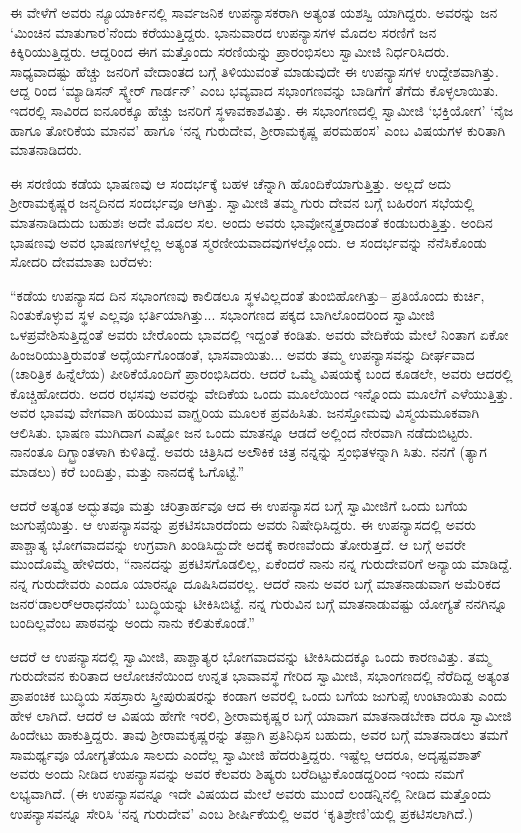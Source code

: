 ಈ ವೇಳೆಗೆ ಅವರು ನ್ಯೂಯಾರ್ಕಿನಲ್ಲಿ ಸಾರ್ವಜನಿಕ ಉಪನ್ಯಾಸಕರಾಗಿ ಅತ್ಯಂತ ಯಶಸ್ವಿ ಯಾಗಿದ್ದರು. ಅವರನ್ನು ಜನ ‘ಮಿಂಚಿನ ಮಾತುಗಾರ’ನೆಂದು ಕರೆಯುತ್ತಿದ್ದರು. ಭಾನುವಾರದ ಉಪನ್ಯಾಸಗಳ ಮೊದಲ ಸರಣಿಗೆ ಜನ ಕಿಕ್ಕಿರಿಯುತ್ತಿದ್ದರು. ಆದ್ದರಿಂದ ಈಗ ಮತ್ತೊಂದು ಸರಣಿಯನ್ನು ಪ್ರಾರಂಭಿಸಲು ಸ್ವಾಮೀಜಿ ನಿರ್ಧರಿಸಿದರು. ಸಾಧ್ಯವಾದಷ್ಟು ಹೆಚ್ಚು ಜನರಿಗೆ ವೇದಾಂತದ ಬಗ್ಗೆ ತಿಳಿಯುವಂತೆ ಮಾಡುವುದೇ ಈ ಉಪನ್ಯಾಸಗಳ ಉದ್ದೇಶವಾಗಿತ್ತು. ಆದ್ದ ರಿಂದ ‘ಮ್ಯಾಡಿಸನ್ ಸ್ಕ್ವೇರ್ ಗಾರ್ಡನ್​’ ಎಂಬ ಭವ್ಯವಾದ ಸಭಾಂಗಣವನ್ನು ಬಾಡಿಗೆಗೆ ತೆಗೆದು ಕೊಳ್ಳಲಾಯಿತು. ಇದರಲ್ಲಿ ಸಾವಿರದ ಐನೂರಕ್ಕೂ ಹೆಚ್ಚು ಜನರಿಗೆ ಸ್ಥಳಾವಕಾಶವಿತ್ತು. ಈ ಸಭಾಂಗಣದಲ್ಲಿ ಸ್ವಾಮೀಜಿ ‘ಭಕ್ತಿಯೋಗ’ ‘ನೈಜ ಹಾಗೂ ತೋರಿಕೆಯ ಮಾನವ’ ಹಾಗೂ ‘ನನ್ನ ಗುರುದೇವ, ಶ್ರೀರಾಮಕೃಷ್ಣ ಪರಮಹಂಸ’ ಎಂಬ ವಿಷಯಗಳ ಕುರಿತಾಗಿ ಮಾತನಾಡಿದರು.

ಈ ಸರಣಿಯ ಕಡೆಯ ಭಾಷಣವು ಆ ಸಂದರ್ಭಕ್ಕೆ ಬಹಳ ಚೆನ್ನಾಗಿ ಹೊಂದಿಕೆಯಾಗುತ್ತಿತ್ತು. ಅಲ್ಲದೆ ಅದು ಶ್ರೀರಾಮಕೃಷ್ಣರ ಜನ್ಮದಿನದ ಸಂದರ್ಭವೂ ಆಗಿತ್ತು. ಸ್ವಾಮೀಜಿ ತಮ್ಮ ಗುರು ದೇವನ ಬಗ್ಗೆ ಬಹಿರಂಗ ಸಭೆಯಲ್ಲಿ ಮಾತನಾಡಿದುದು ಬಹುಶಃ ಅದೇ ಮೊದಲ ಸಲ. ಅಂದು ಅವರು ಭಾವೋನ್ಮತ್ತರಾದಂತೆ ಕಂಡುಬರುತ್ತಿತ್ತು. ಅಂದಿನ ಭಾಷಣವು ಅವರ ಭಾಷಣಗಳಲ್ಲೆಲ್ಲ ಅತ್ಯಂತ ಸ್ಮರಣೀಯವಾದವುಗಳಲ್ಲೊಂದು. ಆ ಸಂದರ್ಭವನ್ನು ನೆನೆಸಿಕೊಂಡು ಸೋದರಿ ದೇವಮಾತಾ ಬರೆದಳು:

“ಕಡೆಯ ಉಪನ್ಯಾಸದ ದಿನ ಸಭಾಂಗಣವು ಕಾಲಿಡಲೂ ಸ್ಥಳವಿಲ್ಲದಂತೆ ತುಂಬಿಹೋಗಿತ್ತು– ಪ್ರತಿಯೊಂದು ಕುರ್ಚಿ, ನಿಂತುಕೊಳ್ಳುವ ಸ್ಥಳ ಎಲ್ಲವೂ ಭರ್ತಿಯಾಗಿತ್ತು... ಸಭಾಂಗಣದ ಪಕ್ಕದ ಬಾಗಿಲೊಂದರಿಂದ ಸ್ವಾಮೀಜಿ ಒಳಪ್ರವೇಶಿಸುತ್ತಿದ್ದಂತೆ ಅವರು ಬೇರೊಂದು ಭಾವದಲ್ಲಿ ಇದ್ದಂತೆ ಕಂಡಿತು. ಅವರು ವೇದಿಕೆಯ ಮೇಲೆ ನಿಂತಾಗ ಏಕೋ ಹಿಂಜರಿಯುತ್ತಿರುವಂತೆ ಅಧೈರ್ಯಗೊಂಡಂತೆ, ಭಾಸವಾಯಿತು... ಅವರು ತಮ್ಮ ಉಪನ್ಯಾಸವನ್ನು ದೀರ್ಘವಾದ (ಚಾರಿತ್ರಿಕ ಹಿನ್ನೆಲೆಯ) ಪೀಠಿಕೆಯೊಂದಿಗೆ ಪ್ರಾರಂಭಿಸಿದರು. ಆದರೆ ಒಮ್ಮೆ ವಿಷಯಕ್ಕೆ ಬಂದ ಕೂಡಲೇ, ಅವರು ಆದರಲ್ಲಿ ಕೊಚ್ಚಿಹೋದರು. ಅದರ ರಭಸವು ಅವರನ್ನು ವೇದಿಕೆಯ ಒಂದು ಮೂಲೆಯಿಂದ ಇನ್ನೊಂದು ಮೂಲೆಗೆ ಎಳೆಯುತ್ತಿತ್ತು. ಅವರ ಭಾವವು ವೇಗವಾಗಿ ಹರಿಯುವ ವಾಗ್ಝರಿಯ ಮೂಲಕ ಪ್ರವಹಿಸಿತು. ಜನಸ್ತೋಮವು ವಿಸ್ಮಯಮೂಕವಾಗಿ ಆಲಿಸಿತು. ಭಾಷಣ ಮುಗಿದಾಗ ಎಷ್ಟೋ ಜನ ಒಂದು ಮಾತನ್ನೂ ಆಡದೆ ಅಲ್ಲಿಂದ ನೇರವಾಗಿ ನಡೆದುಬಿಟ್ಟರು. ನಾನಂತೂ ದಿಗ್ಭ್ರಾಂತಳಾಗಿ ಕುಳಿತಿದ್ದೆ. ಅವರು ಚಿತ್ರಿಸಿದ ಅಲೌಕಿಕ ಚಿತ್ರ ನನ್ನನ್ನು ಸ್ತಂಭಿತಳನ್ನಾಗಿ ಸಿತು. ನನಗೆ (ತ್ಯಾಗ ಮಾಡಲು) ಕರೆ ಬಂದಿತ್ತು, ಮತ್ತು ನಾನದಕ್ಕೆ ಓಗೊಟ್ಟೆ.”

ಆದರೆ ಅತ್ಯಂತ ಅದ್ಭುತವೂ ಮತ್ತು ಚರಿತ್ರಾರ್ಹವೂ ಆದ ಈ ಉಪನ್ಯಾಸದ ಬಗ್ಗೆ ಸ್ವಾಮೀಜಿಗೆ ಒಂದು ಬಗೆಯ ಜುಗುಪ್ಸೆಯಿತ್ತು. ಆ ಉಪನ್ಯಾಸವನ್ನು ಪ್ರಕಟಿಸಬಾರದೆಂದು ಅವರು ನಿಷೇಧಿಸಿದ್ದರು. ಈ ಉಪನ್ಯಾಸದಲ್ಲಿ ಅವರು ಪಾಶ್ಚಾತ್ಯ ಭೋಗವಾದವನ್ನು ಉಗ್ರವಾಗಿ ಖಂಡಿಸಿದ್ದುದೇ ಅದಕ್ಕೆ ಕಾರಣವೆಂದು ತೋರುತ್ತದೆ. ಆ ಬಗ್ಗೆ ಅವರೇ ಮುಂದೊಮ್ಮೆ ಹೇಳಿದರು, “ನಾನದನ್ನು ಪ್ರಕಟಿಸಗೊಡಲಿಲ್ಲ, ಏಕೆಂದರೆ ನಾನು ನನ್ನ ಗುರುದೇವರಿಗೆ ಅನ್ಯಾಯ ಮಾಡಿದ್ದೆ. ನನ್ನ ಗುರುದೇವರು ಎಂದೂ ಯಾರನ್ನೂ ದೂಷಿಸಿದವರಲ್ಲ. ಆದರೆ ನಾನು ಅವರ ಬಗ್ಗೆ ಮಾತನಾಡುವಾಗ ಅಮೆರಿಕದ ಜನರ‘ಡಾಲರ್​ಆರಾಧನೆಯ’ ಬುದ್ಧಿಯನ್ನು ಟೀಕಿಸಿಬಿಟ್ಟೆ. ನನ್ನ ಗುರುವಿನ ಬಗ್ಗೆ ಮಾತನಾಡುವಷ್ಟು ಯೋಗ್ಯತೆ ನನಗಿನ್ನೂ ಬಂದಿಲ್ಲವೆಂಬ ಪಾಠವನ್ನು ಅಂದು ನಾನು ಕಲಿತುಕೊಂಡೆ.”

ಆದರೆ ಆ ಉಪನ್ಯಾಸದಲ್ಲಿ ಸ್ವಾಮೀಜಿ, ಪಾಶ್ಚಾತ್ಯರ ಭೋಗವಾದವನ್ನು ಟೀಕಿಸಿದುದಕ್ಕೂ ಒಂದು ಕಾರಣವಿತ್ತು. ತಮ್ಮ ಗುರುದೇವನ ಕುರಿತಾದ ಆಲೋಚನೆಯಿಂದ ಉನ್ನತ ಭಾವಾವಸ್ಥೆ ಗೇರಿದ ಸ್ವಾಮೀಜಿ, ಸಭಾಂಗಣದಲ್ಲಿ ನೆರೆದಿದ್ದ ಅತ್ಯಂತ ಪ್ರಾಪಂಚಿಕ ಬುದ್ಧಿಯ ಸಹಸ್ರಾರು ಸ್ತ್ರೀಪುರುಷರನ್ನು ಕಂಡಾಗ ಅವರಲ್ಲಿ ಒಂದು ಬಗೆಯ ಜುಗುಪ್ಸೆ ಉಂಟಾಯಿತು ಎಂದು ಹೇಳ ಲಾಗಿದೆ. ಆದರೆ ಆ ವಿಷಯ ಹೇಗೇ ಇರಲಿ, ಶ್ರೀರಾಮಕೃಷ್ಣರ ಬಗ್ಗೆ ಯಾವಾಗ ಮಾತನಾಡಬೇಕಾ ದರೂ ಸ್ವಾಮೀಜಿ ಹಿಂದೇಟು ಹಾಕುತ್ತಿದ್ದರು. ತಾವು ಶ್ರೀರಾಮಕೃಷ್ಣರನ್ನು ತಪ್ಪಾಗಿ ಪ್ರತಿನಿಧಿಸ ಬಹುದು, ಅವರ ಬಗ್ಗೆ ಮಾತನಾಡಲು ತಮಗೆ ಸಾಮರ್ಥ್ಯವೂ ಯೋಗ್ಯತೆಯೂ ಸಾಲದು ಎಂದೆಲ್ಲ ಸ್ವಾಮೀಜಿ ಹೆದರುತ್ತಿದ್ದರು. ಇಷ್ಟೆಲ್ಲ ಆದರೂ, ಅದೃಷ್ಟವಶಾತ್ ಅವರು ಅಂದು ನೀಡಿದ ಉಪನ್ಯಾಸವನ್ನು ಅವರ ಕೆಲವರು ಶಿಷ್ಯರು ಬರೆದಿಟ್ಟುಕೊಂಡದ್ದರಿಂದ ಇಂದು ನಮಗೆ ಲಭ್ಯವಾಗಿದೆ. (ಈ ಉಪನ್ಯಾಸವನ್ನೂ ಇದೇ ವಿಷಯದ ಮೇಲೆ ಅವರು ಮುಂದೆ ಲಂಡನ್ನಿನಲ್ಲಿ ನೀಡಿದ ಮತ್ತೊಂದು ಉಪನ್ಯಾಸವನ್ನೂ ಸೇರಿಸಿ ‘ನನ್ನ ಗುರುದೇವ’ ಎಂಬ ಶೀರ್ಷಿಕೆಯಲ್ಲಿ ಅವರ ‘ಕೃತಿಶ್ರೇಣಿ’ಯಲ್ಲಿ ಪ್ರಕಟಿಸಲಾಗಿದೆ.)

